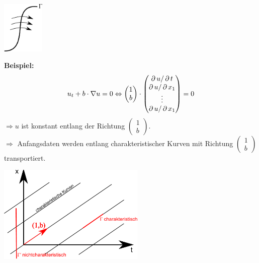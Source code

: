 \begin{itemize}
\begin{minipage}[t][2cm][b]{2.5cm}
		\includegraphics[keepaspectratio,width=2cm]{img/2_charkurv.pdf}
		\end{minipage}
		\textbf{Beispiel:}
		\[ u_t + b \cdot \nabla u = 0 \Leftrightarrow \begin{pmatrix}1 \\ b \end{pmatrix} \cdot \begin{pmatrix}\operatorname{\partial} u / \operatorname{\partial} t \\ \operatorname{\partial} u / \operatorname{\partial} x_1 \\ \vdots \\ \operatorname{\partial} u / \operatorname{\partial} x_1	\end{pmatrix}  = 0 \]
		$\Rightarrow u$ ist konstant entlang der Richtung $\begin{pmatrix}1 \\ b \end{pmatrix}$. \\
		$\Rightarrow$ Anfangsdaten werden entlang charakteristischer Kurven mit Richtung  $\begin{pmatrix}1 \\ b \end{pmatrix}$ transportiert.
		\begin{center}
		\includegraphics[keepaspectratio, width=7cm]{img/2_bsp_charkurv.pdf}
		\end{center}
	\end{itemize}
	
